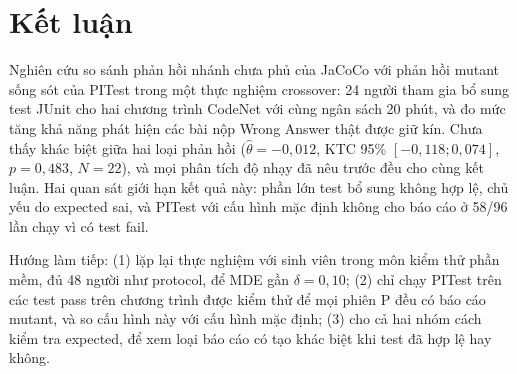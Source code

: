 \section{Kết luận}
\label{sec:conclusion}

Nghiên cứu so sánh phản hồi nhánh chưa phủ của JaCoCo với phản hồi mutant sống sót của PITest trong một thực nghiệm crossover: 24 người tham gia bổ sung test JUnit cho hai chương trình CodeNet với cùng ngân sách 20 phút, và đo mức tăng khả năng phát hiện các bài nộp Wrong Answer thật được giữ kín.
Chưa thấy khác biệt giữa hai loại phản hồi ($\hat{\theta} = -0,012$, KTC 95\% $[-0,118; 0,074]$, $p = 0,483$, $N = 22$), và mọi phân tích độ nhạy đã nêu trước đều cho cùng kết luận.
Hai quan sát giới hạn kết quả này: phần lớn test bổ sung không hợp lệ, chủ yếu do expected sai, và PITest với cấu hình mặc định không cho báo cáo ở 58/96 lần chạy vì có test fail.

Hướng làm tiếp: (1) lặp lại thực nghiệm với sinh viên trong môn kiểm thử phần mềm, đủ 48 người như protocol, để MDE gần $\delta = 0,10$; (2) chỉ chạy PITest trên các test pass trên chương trình được kiểm thử để mọi phiên P đều có báo cáo mutant, và so cấu hình này với cấu hình mặc định; (3) cho cả hai nhóm cách kiểm tra expected, để xem loại báo cáo có tạo khác biệt khi test đã hợp lệ hay không.
